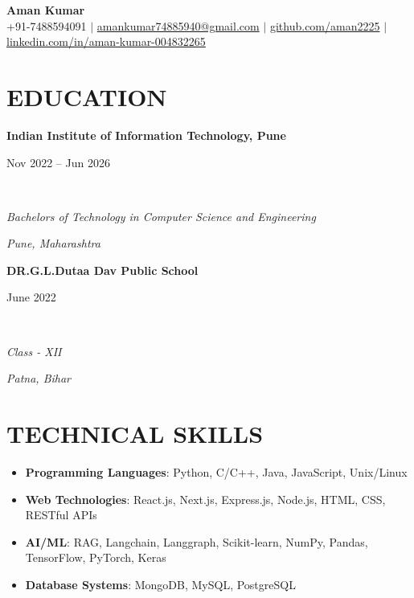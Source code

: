 \documentclass[letterpaper,9pt]{article}
\newcommand{\secgap}{\vspace{4pt}}
\newcommand{\headgap}{\vspace{2pt}}
\newcommand{\bulletgap}{\vspace{1pt}}
\newcommand{\entrygap}{\vspace{4pt}}
\newcommand{\resumeSubheading}[4]{
    \parbox[t]{0.68\textwidth}{\textbf{\small #1}}\hfill\parbox[t]{0.3\textwidth}{\raggedleft\small #2}\\
    \parbox[t]{0.68\textwidth}{\textit{\footnotesize #3}}\hfill\parbox[t]{0.3\textwidth}{\raggedleft\textit{\footnotesize #4}}
}
\begin{document}
\begin{center}
    {\Huge \textbf{Aman Kumar}}\\
    \vspace{2pt}
    \footnotesize
    +91-7488594091 $|$
    \href{mailto:amankumar74885940@gmail.com}{\textcolor{linkcolor}{amankumar74885940@gmail.com}} $|$
    \href{https://github.com/aman2225}{\textcolor{linkcolor}{github.com/aman2225}} $|$
    \href{https://www.linkedin.com/in/aman-kumar-004832265/}{\textcolor{linkcolor}{linkedin.com/in/aman-kumar-004832265}}
\end{center}

\secgap
\section{EDUCATION}
\headgap
\resumeSubheading
{Indian Institute of Information Technology, Pune}{Nov 2022 -- Jun 2026}
{Bachelors of Technology in Computer Science and Engineering} {Pune, Maharashtra}
\entrygap
\resumeSubheading
{DR.G.L.Dutaa Dav Public School}{June 2022}
{Class - XII} {Patna, Bihar}
\secgap
\section{TECHNICAL SKILLS}
\headgap
\begin{itemize}
    \item \textbf{\small Programming Languages}: \footnotesize Python, C/C++, Java, JavaScript, Unix/Linux
    \bulletgap
    \item \textbf{\small Web Technologies}: \footnotesize React.js, Next.js, Express.js, Node.js, HTML, CSS, RESTful APIs
    \bulletgap
    \item \textbf{\small AI/ML}: \footnotesize RAG, Langchain, Langgraph, Scikit-learn, NumPy, Pandas, TensorFlow, PyTorch, Keras
    \bulletgap
    \item \textbf{\small Database Systems}: \footnotesize MongoDB, MySQL, PostgreSQL
\end{itemize}

\secgap
\end{document}

